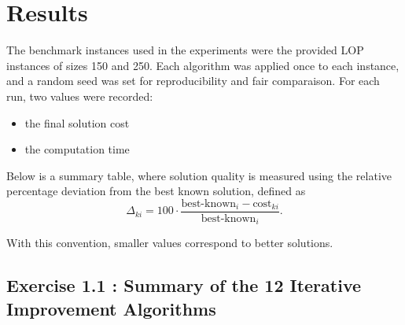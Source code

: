 \section{Results}

The benchmark instances used in the experiments were the provided LOP instances of sizes 150 and 250. Each algorithm was applied once to each instance, and a random seed was set for reproducibility and fair comparaison.
For each run, two values were recorded:
\begin{itemize}[leftmargin=1.5em]
    \item the final solution cost
    \item the computation time
\end{itemize}

Below is a summary table, where solution quality is measured using the relative percentage deviation from the best known solution, defined as
\[
\Delta_{ki} = 100 \cdot \frac{\text{best-known}_i - \text{cost}_{ki}}{\text{best-known}_i}.
\]

With this convention, smaller values correspond to better solutions.

\subsection{Exercise 1.1 : Summary of the 12 Iterative Improvement Algorithms}
\begin{table}[H]
\centering
\caption{Summary results for the 12 iterative improvement algorithms.}
\label{tab:ex1}
\end{table}

